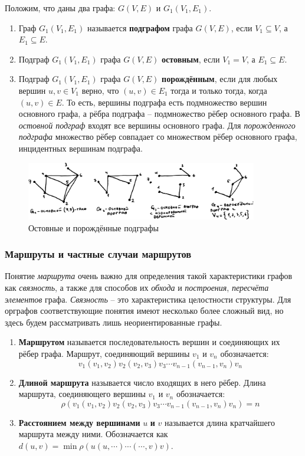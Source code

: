 \documentclass[12pt, a4paper]{article}
\begin{document}
Положим, что даны два графа: $G(V, E)$ и $G_1(V_1, E_1)$.
\begin{enumerate}
 \item Граф $G_1(V_1, E_1)$ называется \textbf{подграфом} графа $G(V, E)$, если $V_1 \subseteq V$, а $E_1 \subseteq E$.
 \item Подграф $G_1(V_1, E_1)$ графа $G(V, E)$ \textbf{остовным}, если $V_1 = V$, а $E_1 \subseteq E$.
 \item Подграф $G_1(V_1, E_1)$ графа $G(V, E)$ \textbf{порождённым}, если для любых вершин $u, v \in V_1$ верно, что $(u, v) \in E_1$ тогда и только тогда, когда $(u, v) \in E$.
 То есть, вершины подграфа есть подмножество вершин основного графа, а рёбра подграфа -- подмножество рёбер основного графа. В \textit{остовной подграф} входят все вершины основного графа. Для \textit{порожденного подграфа} множество рёбер совпадает со множеством рёбер основного графа, инцидентных вершинам подграфа.
\end{enumerate}

\begin{figure}[h]
 \centering
 \includegraphics[width=0.9\textwidth]{35}
 \vspace{-4mm}
  \caption{Остовные и порождённые подграфы}
\end{figure}

\subsubsection{Маршруты и частные случаи маршрутов}

Понятие \textit{маршрута} очень важно для определения такой характеристики графов как \textit{связность}, а также для способов их \textit{обхода} и \textit{построения}, \textit{пересчёта элементов} графа. \textit{Связность} -- это характеристика целостности структуры. Для орграфов соответствующие понятия имеют несколько более сложный вид, но здесь будем рассматривать лишь неориентированные графы.
\begin{enumerate}
\item \textbf{Маршрутом} называется последовательность вершин и соединяющих их рёбер графа. Маршрут, соединяющий вершины $v_1$ и $v_n$ обозначается:
\[v_1(v_1,v_2)v_2(v_2,v_3)v_3 \cdots v_{n-1}(v_{n-1},v_n)v_n \]
\item \textbf{Длиной маршрута} называется число входящих в него рёбер. Длина маршрута, соединяющего вершины $v_1$ и $v_n$ обозначается:
\[\rho (v_1(v_1,v_2)v_2(v_2,v_3)v_3 \cdots v_{n-1}(v_{n-1},v_n)v_n) = n \]
\item \textbf{Расстоянием между вершинами} $u$ \textbf{и} $v$ называется длина кратчайшего маршрута между ними. Обозначается как $d(u, v) = \min \rho (u(u, \cdots) \cdots (\cdots, v)v)$.
\end{enumerate}
\end{document}
